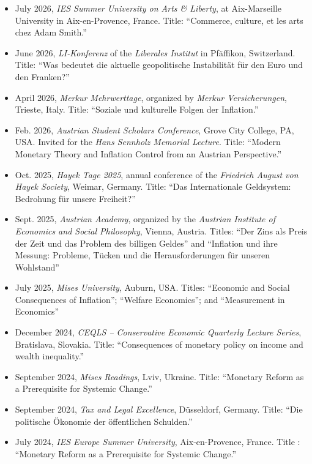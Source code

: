 \documentclass[11pt]{article}
\begin{document}
\begin{itemize}
    \item July 2026, \textit{IES Summer University on Arts \& Liberty}, at Aix-Marseille University in Aix-en-Provence, France. Title: ``Commerce, culture, et les arts chez Adam Smith.''
    \item June 2026, \textit{LI-Konferenz} of the \textit{Liberales Institut} in Pfäffikon, Switzerland. Title: ``Was bedeutet die aktuelle geopolitische Instabilität für den Euro und den Franken?''
    \item April 2026, \textit{Merkur Mehrwerttage}, organized by \textit{Merkur Versicherungen}, Trieste, Italy. Title: ``Soziale und kulturelle Folgen der Inflation.''
    \item Feb. 2026, \textit{Austrian Student Scholars Conference}, Grove City College, PA, USA. Invited for the \textit{Hans Sennholz Memorial Lecture}. Title: ``Modern Monetary Theory and Inflation Control from an Austrian Perspective.''
    \item Oct. 2025, \textit{Hayek Tage 2025}, annual conference of the \textit{Friedrich August von Hayek Society}, Weimar, Germany. Title: ``Das Internationale Geldsystem: Bedrohung für unsere Freiheit?''
    \item Sept. 2025, \textit{Austrian Academy}, organized by the \textit{Austrian Institute of Economics and Social Philosophy}, Vienna, Austria. Titles: ``Der Zins als Preis der Zeit und das Problem des billigen Geldes'' and ``Inflation und ihre Messung: Probleme, Tücken und die Herausforderungen für unseren Wohlstand''  
    \item July 2025, \textit{Mises University}, Auburn, USA. Titles: ``Economic and Social Consequences of Inflation''; ``Welfare Economics''; and ``Measurement in Economics''
    \item December 2024, \textit{CEQLS – Conservative Economic Quarterly Lecture Series}, Bratislava, Slovakia. Title: ``Consequences of monetary policy on income and wealth inequality.''
    \item September 2024, \textit{Mises Readings}, Lviv, Ukraine. Title: ``Monetary Reform as a Prerequisite for Systemic Change.''
    \item September 2024, \textit{Tax and Legal Excellence}, Düsseldorf, Germany. Title: ``Die politische Ökonomie der öffentlichen Schulden.''
    \item July 2024, \textit{IES Europe Summer University}, Aix-en-Provence, France. Title : ``Monetary Reform as a Prerequisite for Systemic Change.''

\end{itemize}
\end{document}
